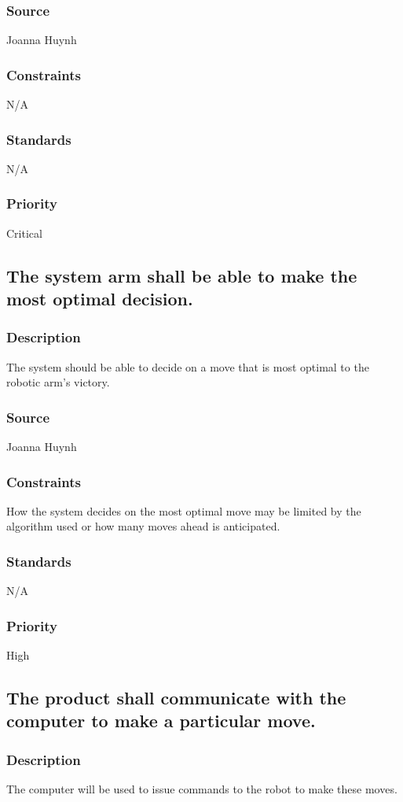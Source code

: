\subsubsection{Source}
Joanna Huynh
\subsubsection{Constraints}
N/A
\subsubsection{Standards}
N/A
\subsubsection{Priority}
Critical

\subsection{The system arm shall be able to make the most optimal decision.}
\subsubsection{Description}
The system should be able to decide on a move that is most optimal to the robotic arm's victory.
\subsubsection{Source}
Joanna Huynh
\subsubsection{Constraints}
How the system decides on the most optimal move may be limited by the algorithm used or how many moves ahead is anticipated.
\subsubsection{Standards}
N/A
\subsubsection{Priority}
High

\subsection{The product shall communicate with the computer to make a particular move.}
\subsubsection{Description}
The computer will be used to issue commands to the robot to make these moves.
